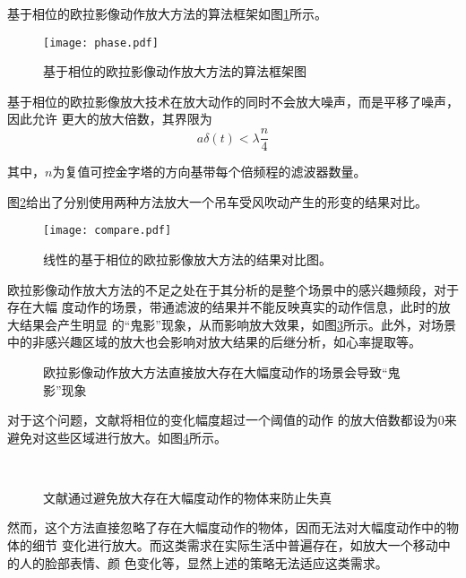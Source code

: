 基于相位的欧拉影像动作放大方法的算法框架如图\ref{fig:phase}所示。

\begin{figure}[htbp]
  \centering
  \texttt{[image: phase.pdf]}
  \caption{基于相位的欧拉影像动作放大方法的算法框架图}
  \label{fig:phase}
\end{figure}

基于相位的欧拉影像放大技术在放大动作的同时不会放大噪声，而是平移了噪声，因此允许
更大的放大倍数，其界限为
\begin{equation}
  \label{eq:bound2}
  a\delta(t)<\lambda \frac{n}{4}
\end{equation}

其中，$n$为复值可控金字塔的方向基带每个倍频程的滤波器数量。

图\ref{fig:compare}给出了分别使用两种方法放大一个吊车受风吹动产生的形变的结果对比。

\begin{figure}[htbp]
  \centering
  \texttt{[image: compare.pdf]}
  \caption{线性的基于相位的欧拉影像放大方法的结果对比图。
  }
  \label{fig:compare}
\end{figure}

欧拉影像动作放大方法的不足之处在于其分析的是整个场景中的感兴趣频段，对于存在大幅
度动作的场景，带通滤波的结果并不能反映真实的动作信息，此时的放大结果会产生明显
的“鬼影”现象，从而影响放大效果，如图\ref{fig:large-motion}所示。此外，对场景
中的非感兴趣区域的放大也会影响对放大结果的后继分析，如心率提取等。

\clearpage

\begin{figure}[htbp]
  \centering
  \qquad
  \caption{欧拉影像动作放大方法直接放大存在大幅度动作的场景会导致“鬼影”现象}
  \label{fig:large-motion}
\end{figure}

对于这个问题，文献\cite{Wadhwa2013PhaseBased}将相位的变化幅度超过一个阈值的动作
的放大倍数都设为0来避免对这些区域进行放大。如图\ref{fig:ignore}所示。

\begin{figure}[htbp]
  \centering
  ~
  \caption{文献\cite{Wadhwa2013PhaseBased}通过避免放大存在大幅度动作的物体来防止失真}
  \label{fig:ignore}
\end{figure}

然而，这个方法直接忽略了存在大幅度动作的物体，因而无法对大幅度动作中的物体的细节
变化进行放大。而这类需求在实际生活中普遍存在，如放大一个移动中的人的脸部表情、颜
色变化等，显然上述的策略无法适应这类需求。

